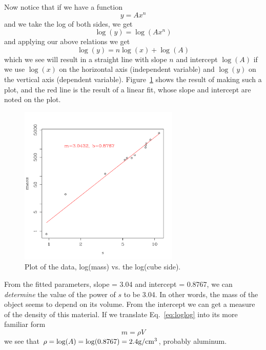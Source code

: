 \documentclass{article}
\begin{document}
Now notice that if we have a function
\begin{equation}
y = A x^n
\end{equation}
and we take the log of both sides, we get
\begin{equation}
\log(y) = \log(Ax^n)
\end{equation}
and applying our above relations we get
\begin{equation}
\log(y) = n \log(x)+ \log(A)
\label{eq:loglog}
\end{equation}
which we see will result in a straight line with slope $n$ and intercept $\log(A)$ if we use $\log(x)$ on the horizontal axis (independent variable) and $\log(y)$ on the vertical axis (dependent variable).  Figure~\ref{fig:loglog} shows the result of making such a plot, and the red line is the result of a linear fit, whose slope and intercept are noted on the plot.
\begin{figure}
\begin{centering}
\includegraphics[width=3in]{../images/logmass-v-log-s.pdf}
\caption{Plot of the data, log(mass) vs. the log(cube side).}
\label{fig:loglog}
\end{centering}
\end{figure}
From the fitted parameters, slope = 3.04 and intercept = 0.8767, we can {\em determine} the value of the power of $s$ to be 3.04.  In other words, the mass of the object seems to depend on its volume.  From the intercept we can get a measure of the density of this material.  If we translate Eq.~\ref{eq:loglog} into its more familiar form
\begin{equation}
m = \rho V
\end{equation}
we see that $\rho = \log(A) = \log(0.8767) = 2.4 {\rm g}/{\rm cm}^3$, probably aluminum.
\end{document}
